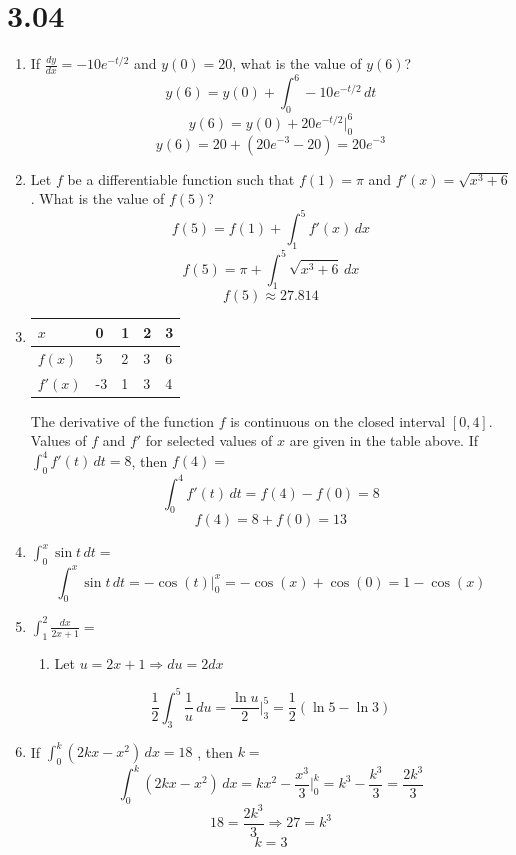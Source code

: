 \documentclass[12pt]{article}
\begin{document}
\section*{3.04}
\begin{enumerate}
    \item If $\frac{dy}{dx}=-10e^{-t/2}$ and $y(0)=20$, what is the value of $y(6)$?
$$y(6)=y(0)+ \int_{0}^{6} -10e^{-t/2} \, dt$$
$$y(6)=y(0)+ 20e^{-t/2} \biggr\rvert_{0}^{6}$$
$$y(6)=20+ (20e^{-3}-20) = \boxed{20e^{-3}}$$
    
    
    \item Let $f$ be a differentiable function such that $f(1)=\pi$ and $f'(x)=\sqrt{x^3+6}$. What is the value of $f(5)$?
    $$f(5)=f(1)+\int_{1}^{5} f'(x) \,dx$$
    $$f(5)=\pi + \int_{1}^{5} \sqrt{x^3+6} \, dx$$
    $$\boxed{f(5)\approx 27.814}$$
    \item 
\begin{table}[h]
\centering
\begin{tabular}{|l||l|l|l|l|}
\hline
$x$ & 0 & 1 & 2 & 3 \\ \hline\hline
$f(x)$ & 5 & 2 & 3 & 6 \\ \hline
$f'(x)$ & -3 & 1 & 3 & 4 \\ \hline
\end{tabular}
\end{table}
The derivative of the function $f$ is continuous on the closed interval $[0,4]$. Values of $f$ and $f'$ for selected values of $x$ are given in the table above. If $\int_{0}^{4} f'(t)\, dt=8$, then $f(4) =$
$$\int_{0}^{4} f'(t)\, dt = f(4)-f(0) =8$$
$$f(4)=8+f(0) = \boxed{13}$$

\item $\int_{0}^{x} \sin t \, dt =$
$$\int_{0}^{x} \sin t \, dt = -\cos(t)\biggr\rvert_{0}^{x} = -\cos(x)+\cos (0) = \boxed{1-\cos(x)} $$
\item $\int_1^2 \frac{dx}{2x+1}=$
\begin{enumerate}
    \item Let $u=2x+1 \Longrightarrow du =2dx$
\end{enumerate}
$$\frac{1}{2}\int_{3}^{5} \frac{1}{u} \, du = \frac{\ln u}{2} \biggr\rvert_{3}^{5} = \boxed{\frac{1}{2} (\ln 5 -\ln 3)}$$
\item If $\int_{0}^{k} (2kx-x^2) \, dx = 18$ , then $k=$
$$\int_{0}^{k} (2kx-x^2) \, dx = kx^2-\frac{x^3}{3}\biggr\rvert_{0}^{k} = k^3-\frac{k^3}{3} = \frac{2k^3}{3}$$
$$18= \frac{2k^3}{3} \Longrightarrow 27=k^3$$
$$\boxed{k=3}$$



\end{enumerate}
\end{document}
